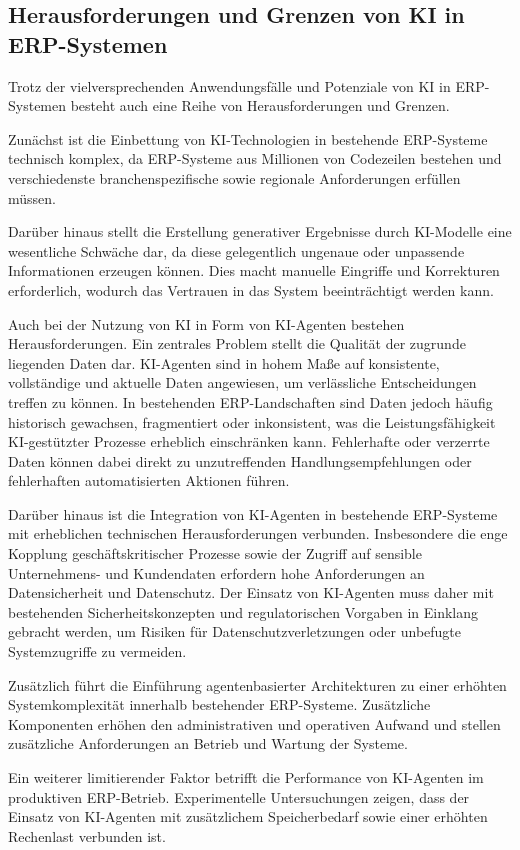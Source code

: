 \subsection{Herausforderungen und Grenzen von KI in ERP-Systemen}
Trotz der vielversprechenden Anwendungsfälle und Potenziale von \ac{KI} in \ac{ERP}-Systemen besteht auch eine Reihe von Herausforderungen und Grenzen. 

Zunächst ist die Einbettung von \ac{KI}-Technologien in bestehende \ac{ERP}-Systeme technisch komplex, da \ac{ERP}-Systeme aus Millionen von Codezeilen bestehen und verschiedenste branchenspezifische sowie regionale Anforderungen erfüllen müssen. \cite[]{sarferaz_implementing_2025}

Darüber hinaus stellt die Erstellung generativer Ergebnisse durch \ac{KI}-Modelle eine wesentliche Schwäche dar, da diese gelegentlich ungenaue oder unpassende Informationen erzeugen können. Dies macht manuelle Eingriffe und Korrekturen erforderlich, wodurch das Vertrauen in das System beeinträchtigt werden kann. \cite[\pagef 73344f]{sarferaz_implementing_2025}

Auch bei der Nutzung von \ac{KI} in Form von \ac{KI}-Agenten bestehen Herausforderungen. Ein zentrales Problem stellt die Qualität der zugrunde liegenden Daten dar. \ac{KI}-Agenten sind in hohem Maße auf konsistente, vollständige und aktuelle Daten angewiesen, um verlässliche Entscheidungen treffen zu können. In bestehenden \ac{ERP}-Landschaften sind Daten jedoch häufig historisch gewachsen, fragmentiert oder inkonsistent, was die Leistungsfähigkeit \ac{KI}-gestützter Prozesse erheblich einschränken kann. Fehlerhafte oder verzerrte Daten können dabei direkt zu unzutreffenden Handlungsempfehlungen oder fehlerhaften automatisierten Aktionen führen. \cite[]{gujar_role_2025}

Darüber hinaus ist die Integration von \ac{KI}-Agenten in bestehende \ac{ERP}-Systeme mit erheblichen technischen Herausforderungen verbunden. Insbesondere die enge Kopplung geschäftskritischer Prozesse sowie der Zugriff auf sensible Unternehmens- und Kundendaten erfordern hohe Anforderungen an Datensicherheit und Datenschutz. Der Einsatz von \ac{KI}-Agenten muss daher mit bestehenden Sicherheitskonzepten und regulatorischen Vorgaben in Einklang gebracht werden, um Risiken für Datenschutzverletzungen oder unbefugte Systemzugriffe zu vermeiden. \cite[\pagef 1035f]{gujar_role_2025}

Zusätzlich führt die Einführung agentenbasierter Architekturen zu einer erhöhten Systemkomplexität innerhalb bestehender \ac{ERP}-Systeme. Zusätzliche Komponenten erhöhen den administrativen und operativen Aufwand und stellen zusätzliche Anforderungen an Betrieb und Wartung der Systeme. \cite[\pagef 178956f]{sarferaz_implementing_2025-1}

Ein weiterer limitierender Faktor betrifft die Performance von \ac{KI}-Agenten im produktiven \ac{ERP}-Betrieb. Experimentelle Untersuchungen zeigen, dass der Einsatz von \ac{KI}-Agenten mit zusätzlichem Speicherbedarf sowie einer erhöhten Rechenlast verbunden ist. \cite[\pagef 178956f]{sarferaz_implementing_2025-1}

